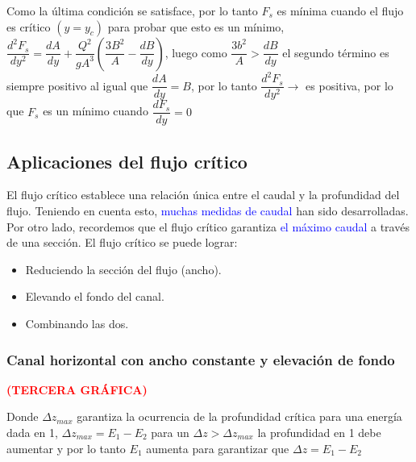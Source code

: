\documentclass[a4paper, 11pt]{article}
\begin{document}
Como la última condición se satisface, por lo tanto $F_{s}$ es mínima cuando el flujo es crítico $(y=y_c)$ para probar que esto es un mínimo, $\dfrac{d^{2}F_{s}}{dy^{2}}=\dfrac{dA}{dy}+\dfrac{Q^{2}}{gA^{3}}\left(\dfrac{3B^{2}}{A}-\dfrac{dB}{dy}\right)$, luego como $\dfrac{3b^{2}}{A}>\dfrac{dB}{dy}$ el segundo término es siempre positivo al igual que $\dfrac{dA}{dy}=B$, por lo tanto $\dfrac{d^{2}F_{s}}{dy^{2}}\rightarrow$ es positiva, por lo que $F_s$ es un mínimo cuando $\dfrac{dF_{s}}{dy}=0$

\subsection{Aplicaciones del flujo crítico}

El flujo crítico establece una relación única entre el caudal y la profundidad del flujo. Teniendo en cuenta esto, \textcolor{blue}{muchas medidas de caudal} han sido desarrolladas. Por otro lado, recordemos que el flujo crítico garantiza \textcolor{blue}{el máximo caudal} a través de una sección. El flujo crítico se puede lograr:

\begin{itemize}
    \item Reduciendo la sección del flujo (ancho).
    \item Elevando el fondo del canal.
    \item Combinando las dos.
\end{itemize}

\subsubsection{Canal horizontal con ancho constante y elevación de fondo}

\textcolor{red}{\textbf{(TERCERA GRÁFICA)}} \vspace{1ex}


Donde $\Delta z_{max}$ garantiza la ocurrencia de la profundidad crítica para una energía dada en 1, $\Delta z_{max}=E_{1}-E_{2}$ para un $\Delta z>\Delta z_{max}$ la profundidad en 1 debe aumentar y por lo tanto $E_{1}$ aumenta para garantizar que $\Delta z=E_{1}-E_{2}$
\end{document}
